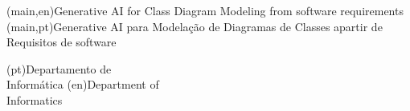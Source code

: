 
%


\nttitle(main,en){Generative AI for Class Diagram Modeling from software requirements}%
\nttitle(main,pt){Generative AI para Modelação de Diagramas de Classes apartir de Requisitos de software}%



\ntdepartment*(pt){Departamento de \\ Informática}
\ntdepartment*(en){Department of\\ Informatics}

